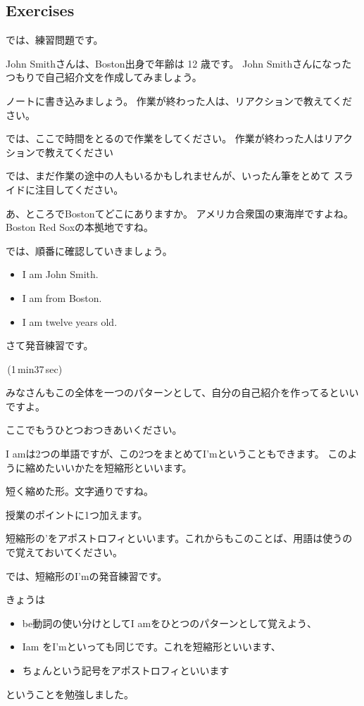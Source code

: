 \documentclass[book,jafontscale=0.9247]{jlreq}
\newenvironment{my_check}
  {\begin{itemize}
    \renewcommand\labelitemi{$\square\hspace{0.5em}$}} %
  {\end{itemize}}
\newcommand{\mySagyo}{%
\par%
\bigskip
では、ここで時間をとるので作業をしてください。
作業が終わった人はリアクションで教えてください\par%
\begin{minipage}[t]{.98\textwidth}
\mbox{}\hrulefill\mbox{}\par%
\mbox{}\hfill{}\raisebox{-.5\height}{作業}\hfill\mbox{}\par%
\mbox{}\hrulefill\mbox{}
\end{minipage}%
\par%
\bigskip%
では、まだ作業の途中の人もいるかもしれませんが、いったん筆をとめて
スライドに注目してください。%
\par%
\bigskip
}
\newcommand{\myStartLesson}{%
\vspace*{5pt}%
\noindent{}{\Large\gtfamily 授業スタート！}
\begin{my_check}
\item マイクON
\item カメラON\hspace{40pt}{\LARGE \ComputerMouse}
\end{my_check}
みなさん、こんにちは。
エデュオプちばの英語の授業にようこそ。\par
さて
音声は届いていますか？
なにかトラブルがあったら、チャットで教えてください。
どうぞよろしくお願いします。\par
きょうも暑いですね。
体調管理にはじゅうぶん気をつけてください。
みなさんも熱中症にならないように、
適切な水分補給をお願いします。
授業中でも差し支えありません。
遠慮なく水分を補給しながら、
リラックスして参加してください。\par
それでは授業にはいります。
\begin{my_check}
\item カメラOFF\hspace{40pt}{\LARGE \ComputerMouse}
\end{my_check}
}
\begin{document}
\newpage
\subsection{Exercises}
では、練習問題です。

John Smithさんは、Boston出身で年齢は 12 歳です。
John Smithさんになったつもりで自己紹介文を作成してみましょう。


ノートに書き込みましょう。
作業が終わった人は、リアクションで教えてください。

\mySagyo

あ、ところでBostonてどこにありますか。
アメリカ合衆国の東海岸ですよね。
Boston Red Soxの本拠地ですね。

では、順番に確認していきましょう。

\begin{itemize}
 \item I am John Smith.
 \item I am from Boston.
 \item I am twelve years old.
\end{itemize}

さて発音練習です。

\faVolumeUp\,(1\,min37\,sec)

みなさんもこの全体を一つのパターンとして、自分の自己紹介を作ってるといいですよ。


ここでもうひとつおつきあいください。

{\large \ComputerMouse}

I amは2つの単語ですが、この2つをまとめてI'mということもできます。
このように縮めたいいかたを短縮形といいます。

短く縮めた形。文字通りですね。

授業のポイントに1つ加えます。

短縮形の'をアポストロフィといいます。これからもこのことば、用語は使うので覚えておいてください。


では、短縮形のI'mの発音練習です。

きょうは
\begin{itemize}
 \item be動詞の使い分けとしてI amをひとつのパターンとして覚えよう、
 \item Iam をI'mといっても同じです。これを短縮形といいます、
 \item ちょんという記号をアポストロフィといいます
\end{itemize}
ということを勉強しました。


{\large \ComputerMouse}
\newpage
%
%
%
%
%
\end{document}
